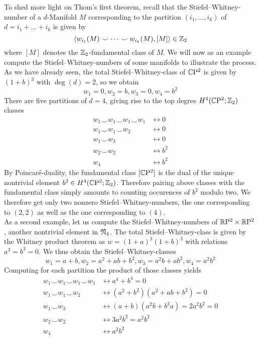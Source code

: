 To shed more light on Thom's first theorem, recall that the Stiefel--Whitney-number of a $d$-Manifold $M$ corresponding to the partition $(i_1,\dots , i_k)$ of $d= i_1 + \dots + i_k$ is given by 
\begin{equation*}
    \langle w_{i_1}(M) \smile \cdots \smile w_{i_k}(M) , [M]\rangle
\in \mathbb{Z}_2
\end{equation*}
where $[M]$ denotes the $\mathbb{Z}_2$-fundamental class of $M$.
We will now as an example compute the Stiefel--Whitney-numbers of some manifolds to illustrate the process.
As we have already seen, the total Stiefel--Whitney-class of $\mathbb{C}\mathrm{P}^2$ is given by $(1 + b)^3$ with $\deg(d) = 2$, so we obtain \begin{equation*}
    w_1 = 0, w_2 = b, w_3 = 0, w_4 = b^2
\end{equation*}
There are five partitions of $d = 4$, giving rise to the top degree $H^4(\mathbb{C}\mathrm{P}^2;\mathbb{Z}_2)$ classes 
\begin{equation*}
    \begin{split}
        w_1\smile w_1 \smile w_1 \smile w_1 & \leftrightarrow 0 \\
        w_1\smile w_1 \smile w_2 & \leftrightarrow 0 \\
        w_1\smile w_3 & \leftrightarrow 0 \\
        w_2\smile w_2  & \leftrightarrow b^2 \\
        w_4  & \leftrightarrow b^2 
    \end{split}
\end{equation*}
By Poincar\'e-duality, the fundamental class $[\mathbb{C}\mathrm{P}^2]$ is the dual of the unique nontrivial element $b^2 \in H^4(\mathbb{C}\mathrm{P}^2;\mathbb{Z}_2)$.
Therefore pairing above classes with the fundamental class simply amounts to counting occurences of $b^2$ modulo two.
We therefore get only two nonzero Stiefel--Whitney-numbers, the one corresponding to $(2,2)$ as well as the one corresponding to $(4)$.\\
As a second example, let us compute the Stiefel--Whitney-numbers of $\mathbb{R}\mathrm{P}^2\times \mathbb{R}\mathrm{P}^2$, another nontrivial element in $\mathfrak{N}_4$.
The total Stiefel--Whitney-class is given by the Whitney product theorem as $w = (1 + a)^3(1 + b)^3$ with relations $a^3 = b^3 = 0$.
We thus obtain the Stiefel--Whitney-classes
\begin{equation*}
    w_1 = a + b, w_2 = a^2 + ab + b^2, w_3 = a^2 b + a b^2, w_4 = a^2 b^2
\end{equation*}
Computing for each partition the product of those classes yields
\begin{equation*}
    \begin{split}
        w_1\smile w_1 \smile w_1 \smile w_1 & \leftrightarrow a^4 + b^4 = 0 \\
        w_1\smile w_1 \smile w_2 & \leftrightarrow (a^2 + b^2)(a^2 + ab + b^2) = 0 \\
        w_1\smile w_3 & \leftrightarrow (a + b)(a^2 b + b^2 a) = 2a^2 b^2 = 0 \\
        w_2\smile w_2  & \leftrightarrow 3 a^2b^2 = a^2b^2\\
        w_4  & \leftrightarrow a^2b^2 
    \end{split}
\end{equation*}

